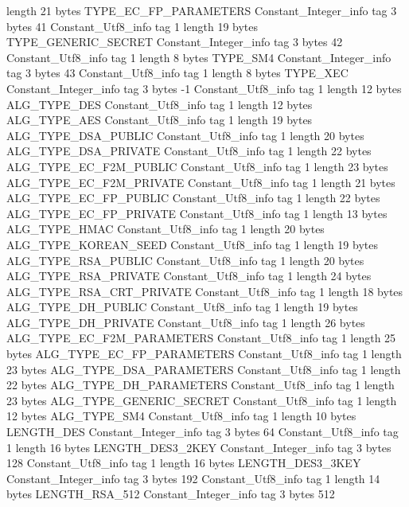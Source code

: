 {{{			length	21
			bytes	TYPE_EC_FP_PARAMETERS
		}
		Constant_Integer_info {
			tag	3
			bytes	41
		}
		Constant_Utf8_info {
			tag	1
			length	19
			bytes	TYPE_GENERIC_SECRET
		}
		Constant_Integer_info {
			tag	3
			bytes	42
		}
		Constant_Utf8_info {
			tag	1
			length	8
			bytes	TYPE_SM4
		}
		Constant_Integer_info {
			tag	3
			bytes	43
		}
		Constant_Utf8_info {
			tag	1
			length	8
			bytes	TYPE_XEC
		}
		Constant_Integer_info {
			tag	3
			bytes	-1
		}
		Constant_Utf8_info {
			tag	1
			length	12
			bytes	ALG_TYPE_DES
		}
		Constant_Utf8_info {
			tag	1
			length	12
			bytes	ALG_TYPE_AES
		}
		Constant_Utf8_info {
			tag	1
			length	19
			bytes	ALG_TYPE_DSA_PUBLIC
		}
		Constant_Utf8_info {
			tag	1
			length	20
			bytes	ALG_TYPE_DSA_PRIVATE
		}
		Constant_Utf8_info {
			tag	1
			length	22
			bytes	ALG_TYPE_EC_F2M_PUBLIC
		}
		Constant_Utf8_info {
			tag	1
			length	23
			bytes	ALG_TYPE_EC_F2M_PRIVATE
		}
		Constant_Utf8_info {
			tag	1
			length	21
			bytes	ALG_TYPE_EC_FP_PUBLIC
		}
		Constant_Utf8_info {
			tag	1
			length	22
			bytes	ALG_TYPE_EC_FP_PRIVATE
		}
		Constant_Utf8_info {
			tag	1
			length	13
			bytes	ALG_TYPE_HMAC
		}
		Constant_Utf8_info {
			tag	1
			length	20
			bytes	ALG_TYPE_KOREAN_SEED
		}
		Constant_Utf8_info {
			tag	1
			length	19
			bytes	ALG_TYPE_RSA_PUBLIC
		}
		Constant_Utf8_info {
			tag	1
			length	20
			bytes	ALG_TYPE_RSA_PRIVATE
		}
		Constant_Utf8_info {
			tag	1
			length	24
			bytes	ALG_TYPE_RSA_CRT_PRIVATE
		}
		Constant_Utf8_info {
			tag	1
			length	18
			bytes	ALG_TYPE_DH_PUBLIC
		}
		Constant_Utf8_info {
			tag	1
			length	19
			bytes	ALG_TYPE_DH_PRIVATE
		}
		Constant_Utf8_info {
			tag	1
			length	26
			bytes	ALG_TYPE_EC_F2M_PARAMETERS
		}
		Constant_Utf8_info {
			tag	1
			length	25
			bytes	ALG_TYPE_EC_FP_PARAMETERS
		}
		Constant_Utf8_info {
			tag	1
			length	23
			bytes	ALG_TYPE_DSA_PARAMETERS
		}
		Constant_Utf8_info {
			tag	1
			length	22
			bytes	ALG_TYPE_DH_PARAMETERS
		}
		Constant_Utf8_info {
			tag	1
			length	23
			bytes	ALG_TYPE_GENERIC_SECRET
		}
		Constant_Utf8_info {
			tag	1
			length	12
			bytes	ALG_TYPE_SM4
		}
		Constant_Utf8_info {
			tag	1
			length	10
			bytes	LENGTH_DES
		}
		Constant_Integer_info {
			tag	3
			bytes	64
		}
		Constant_Utf8_info {
			tag	1
			length	16
			bytes	LENGTH_DES3_2KEY
		}
		Constant_Integer_info {
			tag	3
			bytes	128
		}
		Constant_Utf8_info {
			tag	1
			length	16
			bytes	LENGTH_DES3_3KEY
		}
		Constant_Integer_info {
			tag	3
			bytes	192
		}
		Constant_Utf8_info {
			tag	1
			length	14
			bytes	LENGTH_RSA_512
		}
		Constant_Integer_info {
			tag	3
			bytes	512
}}}
